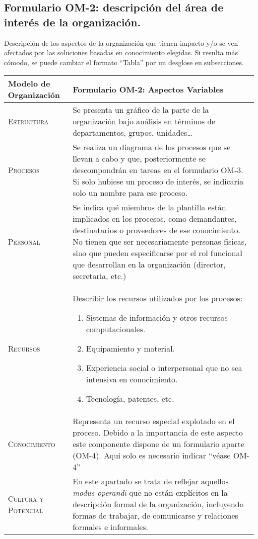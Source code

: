 \documentclass[12pt,a4paper,twoside,spanish]{article}      %
\begin{document}
\pagebreak
\subsection{Formulario OM-2: descripción del área de interés de la organización.}

{\color{blue}  
Descripción de los aspectos de la organización que tienen impacto y/o se ven afectados
  por las soluciones basadas en conocimiento elegidas. Si resulta más cómodo, se puede cambiar el formato ``Tabla'' por un desglose en subsecciones. }


\begin{table}[H]
\scriptsize
\begin{tabularx}{\textwidth}{|l|X|} \hline
\textbf{Modelo de Organización} & \textbf{Formulario OM-2: Aspectos Variables} \\ \hline\hline

\textsc{Estructura} & Se presenta un gráfico de la parte de la organización bajo análisis en términos de
departamentos, grupos, unidades\ldots\\ \hline
\textsc{Procesos} & Se realiza un diagrama de los procesos que se llevan a cabo y que, posteriormente se descompondrán en tareas en el formulario OM-3. Si solo hubiese un proceso de interés, se indicaría solo un nombre para ese proceso.\\ \hline
\textsc{Personal} &  Se indica qué miembros de la plantilla están implicados en los procesos, como demandantes, destinatarios o proveedores de ese conocimiento. No tienen que ser necesariamente personas físicas, sino que pueden especificarse por el rol
funcional que desarrollan en la organización (director, secretaria, etc.)\\ \hline
\textsc{Recursos} &  Describir los recursos utilizados por los procesos:
\begin{enumerate}
    \item Sistemas de información y otros recursos computacionales.
    \item Equipamiento y material.
    \item Experiencia social o interpersonal que no sea intensiva en conocimiento.
    \item Tecnología, patentes, etc.
\end{enumerate}
\\ \hline
\textsc{Conocimiento} &  Representa un recurso especial explotado en el proceso. Debido a la
importancia de este aspecto este componente dispone de un formulario aparte (OM-4). Aquí solo es necesario indicar ``véase OM-4'' \\ \hline
\textsc{Cultura y Potencial} &  En este apartado se trata de reflejar aquellos \textit{modus operandi} que no están explícitos en la descripción formal de la organización, incluyendo formas de trabajar, de comunicarse y relaciones formales e informales.\\ \hline
\end{tabularx}
  \label{tab.OM2}
\end{table}
\end{document}
